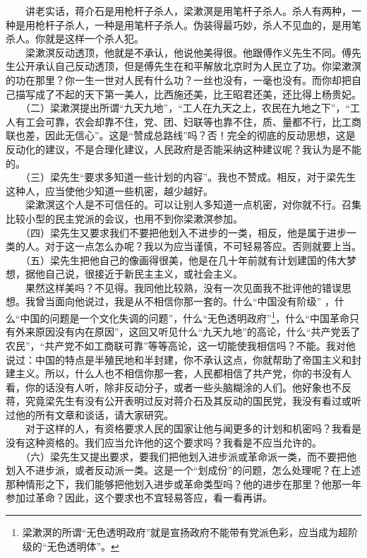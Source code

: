 \documentclass[cn,11pt,chinese]{elegantbook}
\begin{document}
　　讲老实话，蒋介石是用枪杆子杀人，梁漱溟是用笔杆子杀人。杀人有两种，一种是用枪杆子杀人，一种是用笔杆子杀人。伪装得最巧妙，杀人不见血的，是用笔杀人。你就是这样一个杀人犯。\\
　　梁漱溟反动透顶，他就是不承认，他说他美得很。他跟傅作义先生不同。傅先生公开承认自己反动透顶，但是傅先生在和平解放北京时为人民立了功。你梁漱溟的功在那里？你一生一世对人民有什么功？一丝也没有，一毫也没有。而你却把自己描写成了不起的天下第一美人，比西施还美，比王昭君还美，还比得上杨贵妃。\\
　　（二）梁漱溟提出所谓“九天九地”，“工人在九天之上，农民在九地之下”，“工人有工会可靠，农会却靠不住，党、团、妇联等也靠不住，质、量都不行，比工商联也差，因此无信心”。这是“赞成总路线”吗？否！完全的彻底的反动思想，这是反动化的建议，不是合理化建议，人民政府是否能采纳这种建议呢？我认为是不能的。\\
　　（三）梁先生“要求多知道一些计划的内容”。我也不赞成。相反，对于梁先生这种人，应当使他少知道一些机密，越少越好。\\
　　梁漱溟这个人是不可信任的。可以让别人多知道一点机密，对你就不行。召集比较小型的民主党派的会议，也用不到你梁漱溟参加。\\
　　（四）梁先生又要求我们不要把他划入不进步的一类，相反，他是属于进步一类的人。对于这一点怎么办呢？我以为应当谨慎，不可轻易答应。否则就要上当。\\
　　（五）梁先生把他自己的像画得很美，他是在几十年前就有计划建国的伟大梦想，据他自己说，很接近于新民主主义，或社会主义。\\
　　果然这样美吗？不见得。我同他比较熟，没有一次见面我不批评他的错误思想。我曾当面向他说过，我是从不相信你那一套的。什么“中国没有阶级” ，什么“中国的问题是一个文化失调的问题”，什么“无色透明政府”\footnote[1]{ 梁漱溟的所谓“无色透明政府”就是宣扬政府不能带有党派色彩，应当成为超阶级的“无色透明体”。}，什么“中国革命只有外来原因没有内在原因”，这回又听见什么“九天九地”的高论，什么“共产党丢了农民”，“共产党不如工商联可靠”等等高论，这一切能使我相信吗？不能。我对他说过：中国的特点是半殖民地和半封建，你不承认这点，你就帮助了帝国主义和封建主义。所以，什么人也不相信你那一套，人民都相信了共产党，你的书没有人看，你的话没有人听，除非反动分子，或者一些头脑糊涂的人们。他好象也不反蒋，究竟梁先生有没有公开表明过反对蒋介石及其反动的国民党，我没有看过或听过他的所有文章和谈话，请大家研究。\\
　　对于这样的人，有资格要求人民的国家让他与闻更多的计划和机密吗？我看是没有这种资格的。我们应当允许他的这个要求吗？我看是不应当允许的。\\
　　（六）梁先生又提出要求，要我们把他划入进步派或革命派一类，而不要把他划入不进步派，或者反动派一类。这是一个“划成份”的问题，怎么处理呢？在上述那种情形之下，我们能够把他划入进步或革命类型吗？他的进步在那里？他那一年参加过革命？因此，这个要求也不宜轻易答应，看一看再讲。\\
\end{document}
